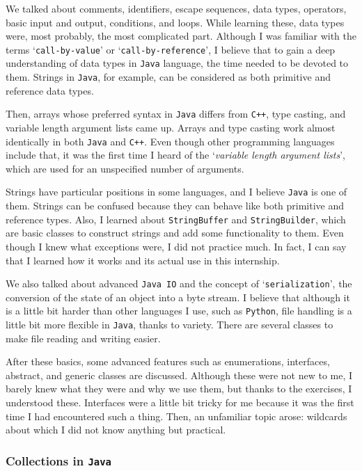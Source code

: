 We talked about comments, identifiers, escape sequences, data types, operators, basic input and output, conditions, and loops. While learning these, data types were, most probably, the most complicated part. Although I was familiar with the terms `\texttt{call-by-value}' or `\texttt{call-by-reference}', I believe that to gain a deep understanding of data types in \texttt{Java} language, the time needed to be devoted to them. Strings in \texttt{Java}, for example, can be considered as both primitive and reference data types.

Then, arrays whose preferred syntax in \texttt{Java} differs from \texttt{C++}, type casting, and variable length argument lists came up. Arrays and type casting work almost identically in both \texttt{Java} and \texttt{C++}. Even though other programming languages include that, it was the first time I heard of the `\textit{variable length argument lists}', which are used for an unspecified number of arguments.

Strings have particular positions in some languages, and I believe \texttt{Java} is one of them. Strings can be confused because they can behave like both primitive and reference types. Also, I learned about \texttt{StringBuffer} and \texttt{StringBuilder}, which are basic classes to construct strings and add some functionality to them. Even though I knew what exceptions were, I did not practice much. In fact, I can say that I learned how it works and its actual use in this internship.

We also talked about advanced \texttt{Java IO} and the concept of `\texttt{serialization}',  the conversion of the state of an object into a byte stream. I believe that although it is a little bit harder than other languages I use, such as \texttt{Python}, file handling is a little bit more flexible in \texttt{Java}, thanks to variety. There are several classes to make file reading and writing easier.

After these basics, some advanced features such as enumerations, interfaces, abstract, and generic classes are discussed. Although these were not new to me, I barely knew what they were and why we use them, but thanks to the exercises, I understood these. Interfaces were a little bit tricky for me because it was the first time I had encountered such a thing. Then, an unfamiliar topic arose: wildcards about which I did not know anything but practical.

\subsubsection{Collections in \texttt{Java}}

